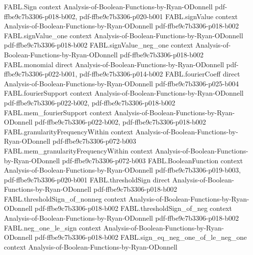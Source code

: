 \begin{theorem}
\label{FABL.andFunction_monotone}
\leanok
{}
\proofstep
  {FABL.Sign}
  {context}
  {Analysis-of-Boolean-Functions-by-Ryan-ODonnell}
  {pdf-ffbe9c7b3306-p018-b002,
    pdf-ffbe9c7b3306-p020-b001}
\proofstep
  {FABL.signValue}
  {context}
  {Analysis-of-Boolean-Functions-by-Ryan-ODonnell}
  {pdf-ffbe9c7b3306-p018-b002}
\proofstep
  {FABL.signValue_one}
  {context}
  {Analysis-of-Boolean-Functions-by-Ryan-ODonnell}
  {pdf-ffbe9c7b3306-p018-b002}
\proofstep
  {FABL.signValue_neg_one}
  {context}
  {Analysis-of-Boolean-Functions-by-Ryan-ODonnell}
  {pdf-ffbe9c7b3306-p018-b002}
\proofstep
  {FABL.monomial}
  {direct}
  {Analysis-of-Boolean-Functions-by-Ryan-ODonnell}
  {pdf-ffbe9c7b3306-p022-b001,
    pdf-ffbe9c7b3306-p014-b002}
\proofstep
  {FABL.fourierCoeff}
  {direct}
  {Analysis-of-Boolean-Functions-by-Ryan-ODonnell}
  {pdf-ffbe9c7b3306-p025-b004}
\proofstep
  {FABL.fourierSupport}
  {context}
  {Analysis-of-Boolean-Functions-by-Ryan-ODonnell}
  {pdf-ffbe9c7b3306-p022-b002,
    pdf-ffbe9c7b3306-p018-b002}
\proofstep
  {FABL.mem_fourierSupport}
  {context}
  {Analysis-of-Boolean-Functions-by-Ryan-ODonnell}
  {pdf-ffbe9c7b3306-p022-b002,
    pdf-ffbe9c7b3306-p018-b002}
\proofstep
  {FABL.granularityFrequencyWithin}
  {context}
  {Analysis-of-Boolean-Functions-by-Ryan-ODonnell}
  {pdf-ffbe9c7b3306-p072-b003}
\proofstep
  {FABL.mem_granularityFrequencyWithin}
  {context}
  {Analysis-of-Boolean-Functions-by-Ryan-ODonnell}
  {pdf-ffbe9c7b3306-p072-b003}
\proofstep
  {FABL.BooleanFunction}
  {context}
  {Analysis-of-Boolean-Functions-by-Ryan-ODonnell}
  {pdf-ffbe9c7b3306-p019-b003,
    pdf-ffbe9c7b3306-p020-b001}
\proofstep
  {FABL.thresholdSign}
  {direct}
  {Analysis-of-Boolean-Functions-by-Ryan-ODonnell}
  {pdf-ffbe9c7b3306-p018-b002}
\proofstep
  {FABL.thresholdSign_of_nonneg}
  {context}
  {Analysis-of-Boolean-Functions-by-Ryan-ODonnell}
  {pdf-ffbe9c7b3306-p018-b002}
\proofstep
  {FABL.thresholdSign_of_neg}
  {context}
  {Analysis-of-Boolean-Functions-by-Ryan-ODonnell}
  {pdf-ffbe9c7b3306-p018-b002}
\proofstep
  {FABL.neg_one_le_sign}
  {context}
  {Analysis-of-Boolean-Functions-by-Ryan-ODonnell}
  {pdf-ffbe9c7b3306-p018-b002}
\proofstep
  {FABL.sign_eq_neg_one_of_le_neg_one}
  {context}
  {Analysis-of-Boolean-Functions-by-Ryan-ODonnell}

\end{theorem}
